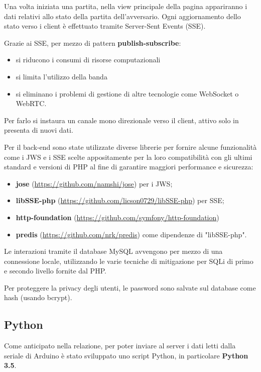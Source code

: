 Una volta iniziata una partita, nella view principale della pagina appariranno i dati relativi allo stato della partita dell'avversario. Ogni aggiornamento dello stato verso i client è effettuato tramite Server-Sent Events (SSE).

Grazie ai SSE, per mezzo di pattern \textbf{publish-subscribe}:
\begin{itemize}
	\item si riducono i consumi di risorse computazionali
	\item si limita l'utilizzo della banda
	\item si eliminano i problemi di gestione di altre tecnologie come WebSocket o WebRTC.
\end{itemize} 
Per farlo si instaura un canale mono direzionale verso il client, attivo solo in presenta di nuovi dati.

Per il back-end sono state utilizzate diverse librerie per fornire alcune funzionalità come i JWS e i SSE scelte appositamente per la loro compatibilità con gli ultimi standard e versioni di PHP al fine di garantire maggiori performance e sicurezza:
\begin{itemize}
	\item \textbf{jose} (\url{https://github.com/namshi/jose}) per i JWS;
	\item \textbf{libSSE-php} (\url{https://github.com/licson0729/libSSE-php}) per SSE;
	\item \textbf{http-foundation} (\url{https://github.com/symfony/http-foundation})
	\item \textbf{predis} (\url{https://github.com/nrk/predis}) come dipendenze di "libSSE-php".
\end{itemize}
Le interazioni tramite il database MySQL avvengono per mezzo di una connessione locale, utilizzando le varie tecniche di mitigazione per SQLi di primo e secondo livello fornite dal PHP.

Per proteggere la privacy degli utenti, le password sono salvate sul database come hash (usando bcrypt).

\subsection{Python}
Come anticipato nella relazione, per poter inviare al server i dati letti dalla seriale di Arduino è stato sviluppato uno script Python, in particolare \textbf{Python 3.5}.

